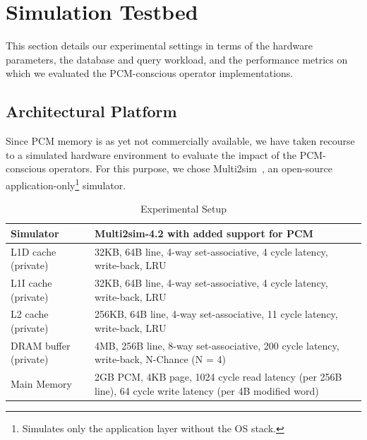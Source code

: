 \section{Simulation Testbed}
\label{sec:exp}

This section details our experimental settings in terms of the hardware
parameters, the database and query workload, and the performance metrics
on which we evaluated the PCM-conscious operator implementations.



\subsection{Architectural Platform}
Since PCM memory is as yet not commercially available, we
have taken recourse to a simulated hardware environment to
evaluate the impact of the PCM-conscious operators.  For this
purpose, we chose Multi2sim~\cite{multi2sim}, an open-source
application-only\footnote{Simulates only the application layer without
the OS stack.} simulator.

\begin{center}
\begin{table}[h]
\begin{small}
\caption{Experimental Setup}
\label{table:setup}
\begin{tabular}{p{4cm}p{12cm}}
\toprule
Simulator & Multi2sim-4.2 with added support for PCM\\ \hline

L1D cache (private) & 32KB, 64B line, 4-way set-associative, 4 cycle latency, write-back, LRU\\ \hline
L1I cache (private) & 32KB, 64B line, 4-way set-associative, 4 cycle latency, write-back, LRU\\ \hline   
L2 cache (private) & 256KB, 64B line, 4-way set-associative, 11 cycle latency, write-back, LRU\\ \hline

DRAM buffer (private) & 4MB, 256B line, 8-way set-associative, 200 cycle latency, write-back, N-Chance (N = 4)\\ \hline

Main Memory & 2GB PCM, 4KB page, 1024 cycle read latency (per 256B line), 64 cycle write latency (per 4B modified word)\\ \bottomrule
\end{tabular}
\end{small}
\end{table}
\end{center}


